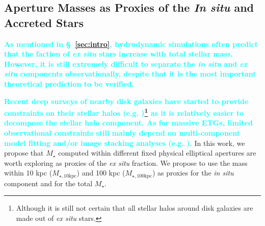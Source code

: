 \documentclass[a4paper,fleqn,usenatbib]{mnras}
\def\mstar{{$M_{\star}$}}
\def\minn{{$M_{\star,10\mathrm{kpc}}$}}
\def\mtot{{$M_{\star,100\mathrm{kpc}}$}}
\newcommand{\song}[1]{\textcolor{cyan}{\textbf{#1}}}
\begin{document}
\subsection{Aperture Masses as Proxies of the \textit{In situ} and Accreted Stars}
    \label{ssec:insitu}
    
    \song{
    As mentioned in \S~\ref{sec:intro}, hydrodynamic simulations often predict that 
    the faction of \textit{ex situ} stars increase with total stellar mass.
    However, it is still extremely difficult to separate the \textit{in situ} and
    \textit{ex situ} components observationally, despite that it is the most 
    important theoretical prediction to be verified. 
    }
    
    \song{
    Recent deep surveys of nearby disk galaxies have started to provide constraints 
    on their stellar halos (e.g. \citealt{Courteau2011, Merritt2016, 
    Harmsen2017})\footnote{Although it is still not certain that all stellar halos
    around disk galaxies are made out of \textit{ex situ} stars.} as it is
    relatively easier to decompose the stellar halo component. 
    As for massive ETGs, limited observational constraints still mainly depend on 
    multi-component model fitting and/or image stacking analyses 
    (e.g. \citealt{Gonzalez2007, Huang2013a, DSouza2014, Spavone2017}).
    }
    In this work, we propose that \mstar{} computed within different fixed physical
    elliptical apertures are worth exploring as proxies of the \textit{ex situ} 
    fraction. 
    We propose to use the mass within 10 kpc (\minn{}) and 100 kpc (\mtot{}) as 
    proxies for the \textit{in situ} component and for the total \mstar{}. 
    
\end{document}
